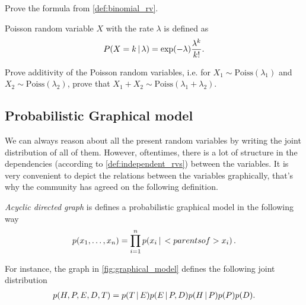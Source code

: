 \begin{exercise}
    Prove the formula from \cref{def:binomial_rv}.
\end{exercise}

\begin{mybox}
\begin{definition}\label{def:poisson_rv}
    Poisson random variable $X$ with the rate $\lambda$ is defined as
    \begin{align}
        P(X = k\,|\, \lambda) = \exp(-\lambda)\frac{\lambda^k}{k!}.
    \end{align}
\end{definition}
\end{mybox}
\begin{exercise}
    Prove additivity of the Poisson random variables, i.e. for $X_1 \sim \text{Poiss}(\lambda_1)$ and $X_2 \sim \text{Poiss}(\lambda_2)$, prove that $X_1 + X_2 \sim \text{Poiss}(\lambda_1+\lambda_2)$.
\end{exercise}

\subsection{Probabilistic Graphical model}

We can always reason about all the present random variables by writing the joint distribution of all of them.
However, oftentimes, there is a lot of structure in the dependencies (according to \cref{def:independent_rvs}) between the variables.
It is very convenient to depict the relations between the variables graphically, that's why the community has agreed on the following definition.

\begin{mybox}
\begin{definition}\label{def:graph_model}
    \textit{Acyclic directed graph} is defines a probabilistic graphical model in the following way
    \begin{align}
        p(x_1,\ldots,x_n) = \prod_{i=1}^n p(x_i \,|\, <parents of > x_i)\,.
    \end{align}
\end{definition}
\end{mybox}
For instance, the graph in \cref{fig:graphical_model} defines the following joint distribution
\begin{align}
    p(H,P,E,D,T) = p(T\,|\, E) p (E\,|\, P,D) p(H \,|\, P)p(P)p(D).
\end{align}


